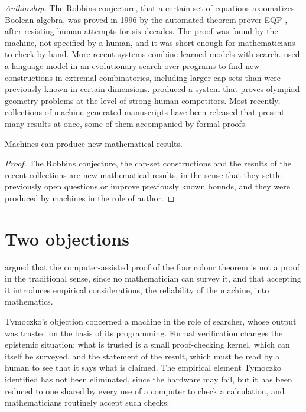 \documentclass{situationist-preprint}
\begin{document}
\emph{Authorship.} The Robbins conjecture, that a certain set of equations axiomatizes Boolean algebra, was proved in 1996 by the automated theorem prover EQP \citep{McCune1997}, after resisting human attempts for six decades. The proof was found by the machine, not specified by a human, and it was short enough for mathematicians to check by hand. More recent systems combine learned models with search. \citet{RomeraParedesEtAl2024} used a language model in an evolutionary search over programs to find new constructions in extremal combinatorics, including larger cap sets than were previously known in certain dimensions. \citet{TrinhEtAl2024} produced a system that proves olympiad geometry problems at the level of strong human competitors. Most recently, collections of machine-generated manuscripts have been released that present many results at once, some of them accompanied by formal proofs.

\begin{proposition}\label{p:main}
Machines can produce new mathematical results.
\end{proposition}

\begin{proof}
The Robbins conjecture, the cap-set constructions and the results of the recent collections are new mathematical results, in the sense that they settle previously open questions or improve previously known bounds, and they were produced by machines in the role of author.
\end{proof}

\section{Two objections}

\begin{objection}[Surveyability]
\citet{Tymoczko1979} argued that the computer-assisted proof of the four colour theorem is not a proof in the traditional sense, since no mathematician can survey it, and that accepting it introduces empirical considerations, the reliability of the machine, into mathematics.
\end{objection}

\begin{reply}
Tymoczko's objection concerned a machine in the role of searcher, whose output was trusted on the basis of its programming. Formal verification changes the epistemic situation: what is trusted is a small proof-checking kernel, which can itself be surveyed, and the statement of the result, which must be read by a human to see that it says what is claimed. The empirical element Tymoczko identified has not been eliminated, since the hardware may fail, but it has been reduced to one shared by every use of a computer to check a calculation, and mathematicians routinely accept such checks.
\end{reply}
\end{document}
